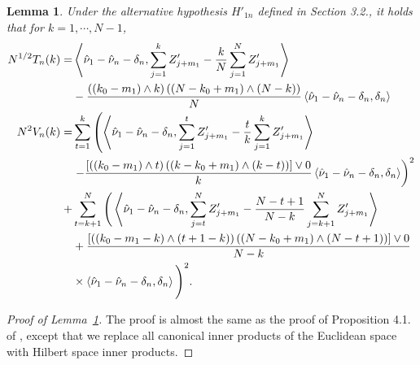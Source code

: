\documentclass[11pt]{article}
\theoremstyle{plain}
\newtheorem{lemma}[theorem]{Lemma}
\theoremstyle{definition}
\theoremstyle{remark}
\begin{document}
\begin{appendix}
 \begin{lemma}\label{lemma:CPD_Power}
     Under the alternative hypothesis $H'_{1n}$ defined in Section 3.2., it holds that for $k=1, \cdots, N-1$,
\begin{align*}
N^{1 / 2} T_n(k)= & \left\langle\hat{\nu}_1-\hat{\nu}_n-\delta_n, \sum_{j=1}^k Z'_{j+m_1}-\frac{k}{N} \sum_{j=1}^N Z'_{j+m_1}\right\rangle \\
& -\frac{\left(\left(k_0-m_1\right) \wedge k\right)\left(\left(N-k_0+m_1\right) \wedge(N-k)\right)}{N}\left\langle\hat{\nu}_1-\hat{\nu}_n-\delta_n, \delta_n\right\rangle \allowdisplaybreaks\\
N^2 V_n(k)= & \sum_{t=1}^k\left(\left\langle\hat{\nu}_1-\hat{\nu}_n-\delta_n, \sum_{j=1}^t Z'_{j+m_1}-\frac{t}{k} \sum_{j=1}^k Z'_{j+m_1}\right\rangle\right. \\
& \left.-\frac{\left[\left(\left(k_0-m_1\right) \wedge t\right)\left(\left(k-k_0+m_1\right) \wedge(k-t)\right)\right] \vee 0}{k}\left\langle\hat{\nu}_1-\hat{\nu}_n-\delta_n, \delta_n\right\rangle\right)^2 \\
+ & \sum_{t=k+1}^N\Bigg(\left\langle\hat{\nu}_1-\hat{\nu}_n-\delta_n, \sum_{j=t}^N Z'_{j+m_1}-\frac{N-t+1}{N-k} \sum_{j=k+1}^N Z'_{j+m_1}\right\rangle \\
& +\frac{\left[\left(\left(k_0-m_1-k\right) \wedge(t+1-k)\right)\left(\left(N-k_0+m_1\right) \wedge(N-t+1)\right)\right] \vee 0}{N-k}\\
&\times\left\langle\hat{\nu}_1-\hat{\nu}_n-\delta_n, \delta_n\right\rangle\Bigg)^2 .
\end{align*}

\end{lemma}

\begin{proof}[Proof of Lemma~\ref{lemma:CPD_Power}]
    The proof is almost the same as the proof of Proposition 4.1. of \cite{gao2023dimension}, except that we replace all canonical inner products of the Euclidean space with Hilbert space inner products.
\end{proof}


\end{appendix}
\end{document}
